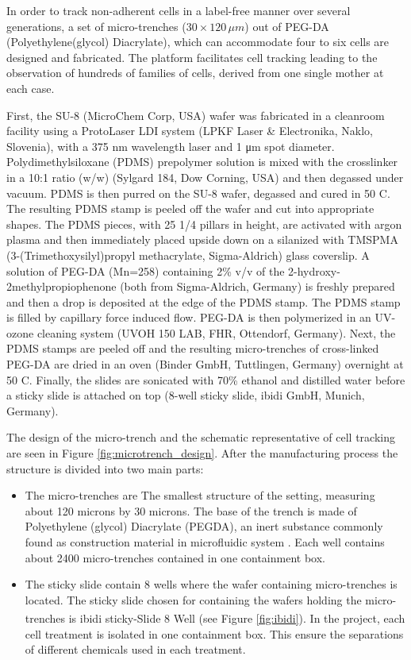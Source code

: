 \documentclass[pdftex,12pt,a4paper]{report}
\begin{document}
In order to track non-adherent cells in a label-free manner over several generations, a set of micro-trenches ($30 \times 120 \, \mu m$) out of PEG-DA (Polyethylene(glycol) Diacrylate), which can accommodate four to six cells are designed and fabricated. The platform facilitates cell tracking leading to the observation of hundreds of families of cells, derived from one single mother at each case.

First, the SU-8 (MicroChem Corp, USA) wafer was fabricated in a cleanroom facility using a ProtoLaser LDI system (LPKF Laser \& Electronika, Naklo, Slovenia), with a 375 nm wavelength laser and 1 μm spot diameter.
Polydimethylsiloxane (PDMS) prepolymer solution is mixed with the crosslinker in a 10:1 ratio (w/w) (Sylgard 184, Dow Corning, USA) and then degassed under vacuum. PDMS is then purred on the SU-8 wafer, degassed and cured in 50 \degree C. The resulting PDMS stamp is peeled off the wafer and cut into appropriate shapes. The PDMS pieces, with 25 1/4 pillars in height, are activated with argon plasma and then immediately placed upside down on a silanized with TMSPMA (3-(Trimethoxysilyl)propyl methacrylate, Sigma-Aldrich) glass coverslip. A solution of PEG-DA (Mn=258) containing 2\% v/v of the 2-hydroxy-2methylpropiophenone (both from Sigma-Aldrich, Germany) is freshly prepared and then a drop is deposited at the edge of the PDMS stamp. The PDMS stamp is filled by capillary force induced flow. PEG-DA is then polymerized in an UV-ozone cleaning system (UVOH 150 LAB, FHR, Ottendorf, Germany). Next, the PDMS stamps are peeled off and the resulting micro-trenches of cross-linked PEG-DA are dried in an oven (Binder GmbH, Tuttlingen, Germany) overnight at 50 \degree C. Finally, the slides are sonicated with 70\% ethanol and distilled water before a sticky slide is attached on top (8-well sticky slide, ibidi GmbH, Munich, Germany).

The design of the micro-trench and the schematic representative of cell tracking are seen in Figure \ref{fig:microtrench_design}. After the manufacturing process the structure is divided into two main parts:

\begin{itemize}
\item The micro-trenches are The smallest structure of the setting, measuring about 120 microns by 30 microns. The base of the trench is made of Polyethylene (glycol) Diacrylate (PEGDA), an inert substance commonly found as construction material in microfluidic system \cite{sekhavati2015marker}. Each well contains about 2400 micro-trenches contained in one containment box.

\item The sticky slide contain 8 wells where the wafer containing micro-trenches is located. The sticky slide chosen for containing the wafers holding the micro-trenches is ibidi\textsuperscript{\textregistered} sticky-Slide 8 Well (see Figure \ref{fig:ibidi}). In the project, each cell treatment is isolated in one containment box. This ensure the separations of different chemicals used in each treatment.

\end{itemize}
\end{document}
